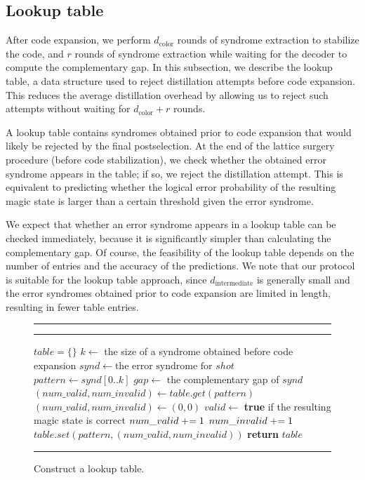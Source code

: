 \subsection{Lookup table}
\label{subsec:msc-ls-lookup-table}
After code expansion, we perform $d_{\mathrm{color}}$ rounds of syndrome extraction to stabilize the code, and $r$ rounds of syndrome extraction while waiting for the decoder to compute the complementary gap.
In this subsection, we describe the lookup table, a data structure used to reject distillation attempts before code expansion.
This reduces the average distillation overhead by allowing us to reject such attempts without waiting for $d_{\mathrm{color}} + r$ rounds.

A lookup table contains syndromes obtained prior to code expansion that would likely be rejected by the final postselection.
At the end of the lattice surgery procedure (before code stabilization), we check whether the obtained error syndrome appears in the table; if so, we reject the distillation attempt.
This is equivalent to predicting whether the logical error probability of the resulting magic state is larger than a certain threshold given the error syndrome.

We expect that whether an error syndrome appears in a lookup table can be checked immediately, because it is significantly simpler than calculating the complementary gap.
Of course, the feasibility of the lookup table depends on the number of entries and the accuracy of the predictions.
We note that our protocol is suitable for the lookup table approach, since $d_{\mathrm{intermediate}}$ is generally small and the error syndromes obtained prior to code expansion are limited in length, resulting in fewer table entries.

\begin{figure}[!t]
  \captionsetup{type=algorithmfigure}
  \hrule \vspace{10pt}
  \caption{Construct a lookup table.}
  \label{alg:construct-lookup-table}
  \hrule \vspace{2pt}
  \begin{algorithmic}
    \State $table = \{\}$
    \State $k \gets $ the size of a syndrome obtained before code expansion
      \State $synd \gets \text{the error syndrome for } shot$
      \State $pattern \gets synd[0..k]$
      \State $gap \gets$ the complementary gap of $synd$
        \State $(num\_valid, num\_invalid) \gets table.get(pattern)$
      \Else
        \State $(num\_valid, num\_invalid) \gets (0, 0)$
      \EndIf
      \State $valid \gets$ \textbf{true} if the resulting magic state is correct
        \State $num\_valid \mathrel{+}= 1$
      \Else
        \State $num\_invalid \mathrel{+}= 1$
      \EndIf
      \State $table.set(pattern, (num\_valid, num\_invalid))$
    \EndFor
  \State \textbf{return} $table$
  \end{algorithmic}
  \vspace{2pt} \hrule
\end{figure}

